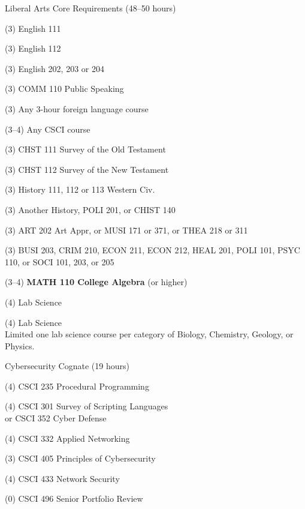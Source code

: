 \begin{reqgroup}{Liberal Arts Core Requirements (48--50 hours)}
\begin{checklist}
\begin{minipage}[t]{0.5\linewidth}
	\item (3) English 111
	\item (3) English 112
	\item (3) English 202, 203 or 204
	\item (3) COMM 110 Public Speaking
	\item (3) Any 3-hour foreign language course
	\item (3--4) Any CSCI course
	\item (3) CHST 111  Survey of the Old Testament
	\item (3) CHST 112  Survey of the New Testament
	\item (3) History 111, 112 or 113 Western Civ.
\end{minipage}
\begin{minipage}[t]{0.5\linewidth}
	\item (3)	Another History, POLI 201, or CHIST 140
	\item (3)	ART 202 Art Appr, or MUSI 171 or 371, or THEA 218 or 311
	\item (3)	BUSI 203, CRIM 210, ECON 211, ECON 212, HEAL 201, POLI 101, PSYC 110, or SOCI 101, 203, or 205
	\item (3--4)	\textbf{MATH 110 College Algebra} (or higher)
	\item (4)	Lab Science
	\item (4)	Lab Science\\Limited one lab science course per category of Biology, Chemistry,
Geology, or Physics.
\end{minipage}
\end{checklist}
\end{reqgroup}


\begin{reqgroup}{Cybersecurity Cognate (19 hours)}%
\begin{checklist}%
\begin{minipage}[t]{0.5\linewidth}%
	\item (4) CSCI 235 Procedural Programming
	\item (4) CSCI 301 Survey of Scripting Languages\\
		or CSCI 352 Cyber Defense
	\item (4) CSCI 332 Applied Networking
	\item (3) CSCI 405 Principles of Cybersecurity
\end{minipage}%
\begin{minipage}[t]{0.5\linewidth}
	\item (4) CSCI 433 Network Security
	\item (0) CSCI 496 Senior Portfolio Review
\end{minipage}
\end{checklist}
\end{reqgroup}

